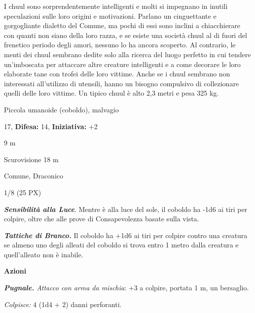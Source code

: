 \begin{multicols}{2}
{I chuul sono sorprendentemente intelligenti e molti si impegnano in inutili speculazioni sulle loro origini e motivazioni. Parlano un cinguettante e gorgogliante dialetto del Comune, ma pochi di essi sono inclini a chiacchierare con quanti non siano della loro razza, e se esiste una società chuul al di fuori del frenetico periodo degli amori, nessuno lo ha ancora scoperto. Al contrario, le menti dei chuul sembrano dedite solo alla ricerca del luogo perfetto in cui tendere un'imboscata per attaccare altre creature intelligenti e a come decorare le loro elaborate tane con trofei delle loro vittime. Anche se i chuul sembrano non interessati all'utilizzo di utensili, hanno un bisogno compulsivo di collezionare quelli delle loro vittime. Un tipico chuul è alto 2,3 metri e pesa 325 kg.

\noindent
\begin{description}[noitemsep, topsep=0pt, parsep=0pt, partopsep=0pt, leftmargin=0cm, labelwidth=2.2cm]
	\item[\textbf{Taglia/Tipo:}] Piccola umanoide (coboldo), malvagio
	\item[\textbf{Caratt.:}] 
	\item[\textbf{Punti Ferita:}] 17,  \textbf{Difesa:} 14,  \textbf{Iniziativa:} +2
	\item[\textbf{Movimento:}] 9 m
	\item[\textbf{Tiri Salvez.:}] 
	\item[\textbf{Sensi:}] Scurovisione 18 m
	\item[\textbf{Linguaggi:}] Comune, Draconico
	\item[\textbf{Sfida:}] 1/8 (25 PX)\smallskip
\end{description}

\emph{\textbf{Sensibilità alla Luce}}. Mentre è alla luce del sole, il coboldo ha -1d6 ai tiri per colpire, oltre che alle prove di Consapevolezza basate sulla vista.

\emph{\textbf{Tattiche di Branco.}} Il coboldo ha +1d6 ai tiri per colpire contro una creatura se almeno uno degli alleati del coboldo si trova entro 1 metro dalla creatura e quell'alleato non è inabile.

\textbf{Azioni}

\emph{\textbf{Pugnale.} Attacco con arma da mischia}: +3 a colpire, portata 1 m, un bersaglio.

\emph{Colpisce:} 4 (1d4 + 2) danni perforanti.

}
\end{multicols}
